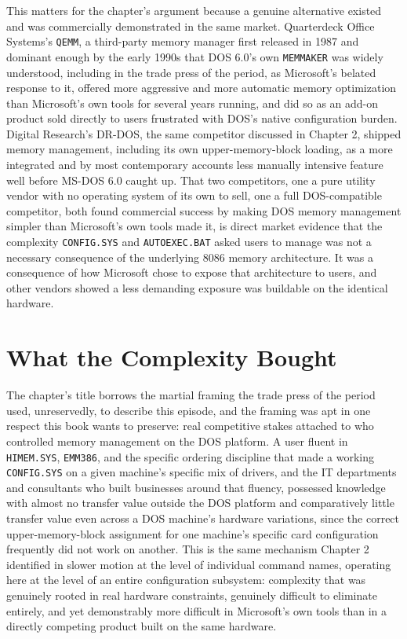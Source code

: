 \documentclass[11pt]{book}
\begin{document}
This matters for the chapter's argument because a genuine alternative existed and was commercially demonstrated in the same market. Quarterdeck Office Systems's \texttt{QEMM}, a third-party memory manager first released in 1987 and dominant enough by the early 1990s that DOS 6.0's own \texttt{MEMMAKER} was widely understood, including in the trade press of the period, as Microsoft's belated response to it, offered more aggressive and more automatic memory optimization than Microsoft's own tools for several years running, and did so as an add-on product sold directly to users frustrated with DOS's native configuration burden. Digital Research's DR-DOS, the same competitor discussed in Chapter 2, shipped memory management, including its own upper-memory-block loading, as a more integrated and by most contemporary accounts less manually intensive feature well before MS-DOS 6.0 caught up. That two competitors, one a pure utility vendor with no operating system of its own to sell, one a full DOS-compatible competitor, both found commercial success by making DOS memory management simpler than Microsoft's own tools made it, is direct market evidence that the complexity \texttt{CONFIG.SYS} and \texttt{AUTOEXEC.BAT} asked users to manage was not a necessary consequence of the underlying 8086 memory architecture. It was a consequence of how Microsoft chose to expose that architecture to users, and other vendors showed a less demanding exposure was buildable on the identical hardware.

\section{What the Complexity Bought}

The chapter's title borrows the martial framing the trade press of the period used, unreservedly, to describe this episode, and the framing was apt in one respect this book wants to preserve: real competitive stakes attached to who controlled memory management on the DOS platform. A user fluent in \texttt{HIMEM.SYS}, \texttt{EMM386}, and the specific ordering discipline that made a working \texttt{CONFIG.SYS} on a given machine's specific mix of drivers, and the IT departments and consultants who built businesses around that fluency, possessed knowledge with almost no transfer value outside the DOS platform and comparatively little transfer value even across a DOS machine's hardware variations, since the correct upper-memory-block assignment for one machine's specific card configuration frequently did not work on another. This is the same mechanism Chapter 2 identified in slower motion at the level of individual command names, operating here at the level of an entire configuration subsystem: complexity that was genuinely rooted in real hardware constraints, genuinely difficult to eliminate entirely, and yet demonstrably more difficult in Microsoft's own tools than in a directly competing product built on the same hardware.
\end{document}
